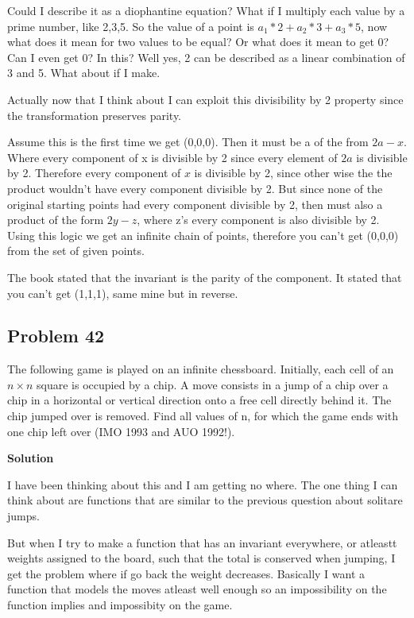 \documentclass[12pt,tikz,border=10pt]{article}
\theoremstyle{definition}
\theoremstyle{remark}
\begin{document}
Could I describe it as a diophantine equation? What if I multiply each value by a prime number, like 2,3,5. 
So the value of a point is $a_1*2+ a_2*3+a_3*5$, now what does it mean for two values to be equal? Or what does it mean to get 0? Can I even get 0? In this?
Well yes, 2 can be described as a linear combination of 3 and 5. What about if I make.

Actually now that I think about I can exploit this divisibility by 2 property since the transformation preserves parity.

Assume this is the first time we get (0,0,0). Then it must be a of the from $2a-x$. Where every component of x is divisible by 2 since every element of $2a$ is divisible by 2.
Therefore every component of $x$ is divisible by 2, since other wise the the product wouldn't have every component divisible by 2. But since 
none of the original starting points had every component divisible by 2, then must also a product of the form $2y-z$, where z's every component is also divisible by 2.
Using this logic we get an infinite chain of points, therefore you can't get (0,0,0) from the set of given points.

The book stated that the invariant is the parity of the component. It stated that you can't get (1,1,1), same mine but in reverse.

\subsection{Problem 42}
The following game is played on an infinite chessboard. Initially, each cell of an
$n\times n$ square is occupied by a chip. A move consists in a jump of a chip over a chip in
a horizontal or vertical direction onto a free cell directly behind it. The chip jumped
over is removed. Find all values of n, for which the game ends with one chip left
over (IMO 1993 and AUO 1992!).

\textbf{Solution}

I have been thinking about this and I am getting no where. The one thing  I can think about 
are functions that are similar to the previous question about solitare jumps. 

But when I try to make a function that has an invariant everywhere, or atleastt weights assigned to the board,
such that the total is conserved when jumping, I get the problem where if go back the weight decreases. 
Basically I want a function that models the moves atleast well enough so an impossibility on the 
function implies and impossibity on the game. 
\end{document}
